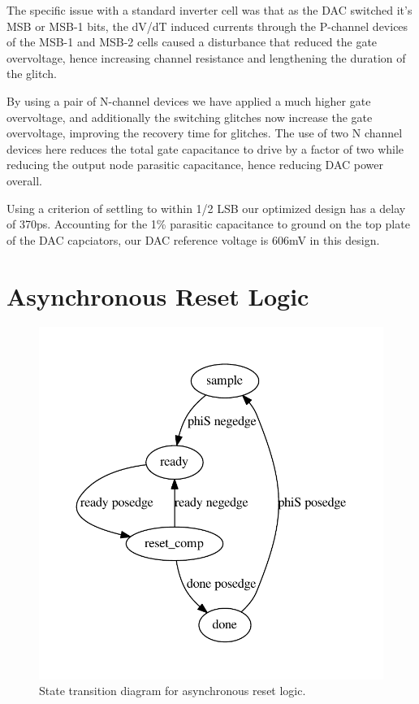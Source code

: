 \documentclass[10pt,journal]{IEEEtran}\usepackage{longtable}
\begin{document}
The specific issue with a standard inverter cell was that as the DAC switched it's MSB or MSB-1 bits, the dV/dT induced currents through the P-channel devices of the MSB-1 and MSB-2 cells caused a disturbance that reduced the gate overvoltage, hence increasing channel resistance and lengthening the duration of the glitch. 

By using a pair of N-channel devices we have applied a much higher gate overvoltage, and additionally the switching glitches now increase the gate overvoltage, improving the recovery time for glitches.
The use of two N channel devices here reduces the total gate capacitance to drive by a factor of two while reducing the output node parasitic capacitance, hence reducing DAC power overall.

Using a criterion of settling to within 1/2 LSB our optimized design has a delay of 370ps.
Accounting for the 1\% parasitic capacitance to ground on the top plate of the DAC capciators, our DAC reference voltage is 606mV in this design. 




\section{Asynchronous Reset Logic}

\begin{figure}[tbph]
\begin{center}
\includegraphics[width=1\columnwidth]{async.pdf}
\caption{State transition diagram for asynchronous reset logic.}
\label{fig:AsyncStateMachine}
\end{center}
\end{figure}
\end{document}
